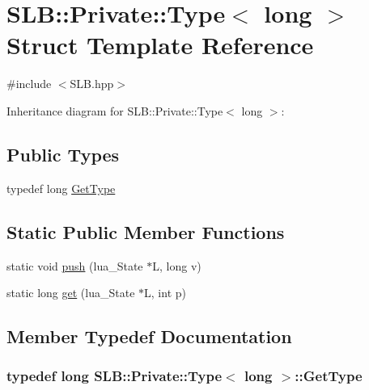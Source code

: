 \hypertarget{structSLB_1_1Private_1_1Type_3_01long_01_4}{}\section{S\+LB\+:\+:Private\+:\+:Type$<$ long $>$ Struct Template Reference}
\label{structSLB_1_1Private_1_1Type_3_01long_01_4}


{\ttfamily \#include $<$S\+L\+B.\+hpp$>$}



Inheritance diagram for S\+LB\+:\+:Private\+:\+:Type$<$ long $>$\+:
\subsection*{Public Types}
\begin{DoxyCompactItemize}
\item 
typedef long \hyperlink{structSLB_1_1Private_1_1Type_3_01long_01_4_a40aa36b6ed44eeda9f1d3a64b86d668b}{Get\+Type}
\end{DoxyCompactItemize}
\subsection*{Static Public Member Functions}
\begin{DoxyCompactItemize}
\item 
static void \hyperlink{structSLB_1_1Private_1_1Type_3_01long_01_4_ab62246910f32119051613c5de07d56f1}{push} (lua\+\_\+\+State $\ast$L, long v)
\item 
static long \hyperlink{structSLB_1_1Private_1_1Type_3_01long_01_4_a9b40713aa0506a213389755380ab4814}{get} (lua\+\_\+\+State $\ast$L, int p)
\end{DoxyCompactItemize}


\subsection{Member Typedef Documentation}
\subsubsection[{\texorpdfstring{Get\+Type}{GetType}}]{\setlength{\rightskip}{0pt plus 5cm}typedef long {\bf S\+L\+B\+::\+Private\+::\+Type}$<$ long $>$\+::{\bf Get\+Type}}\hypertarget{structSLB_1_1Private_1_1Type_3_01long_01_4_a40aa36b6ed44eeda9f1d3a64b86d668b}{}\label{structSLB_1_1Private_1_1Type_3_01long_01_4_a40aa36b6ed44eeda9f1d3a64b86d668b}


